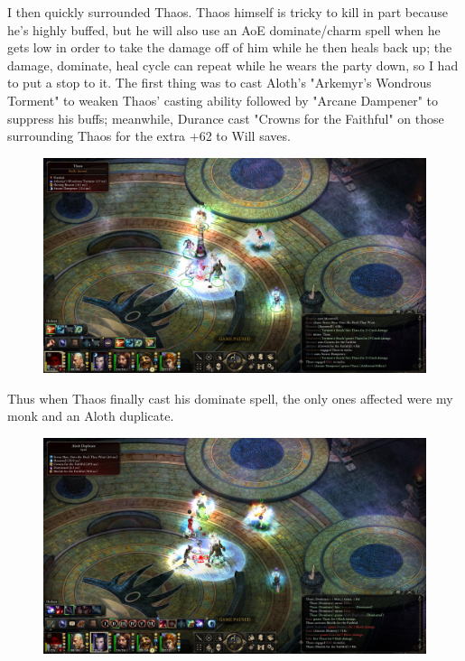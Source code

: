 \documentclass{article}
\begin{document}
I then quickly surrounded Thaos.  Thaos himself is tricky to kill in part because he's highly buffed, but he will also use an AoE dominate/charm spell when he gets low in order to take the damage off of him while he then heals back up; the damage, dominate, heal cycle can repeat while he wears the party down, so I had to put a stop to it.  The first thing was to cast Aloth's "Arkemyr's Wondrous Torment" to weaken Thaos' casting ability followed by "Arcane Dampener" to suppress his buffs; meanwhile, Durance cast "Crowns for the Faithful" on those surrounding Thaos for the extra +62 to Will saves.

\begin{figure}
\includegraphics[scale=0.33]{files/blog/2019_03_17_pillars_of_eternity_path_of_the_damned_act_iv/2019_03_17_thaos4.jpg}
\end{figure}

Thus when Thaos finally cast his dominate spell, the only ones affected were my monk and an Aloth duplicate.

\begin{figure}
\includegraphics[scale=0.33]{files/blog/2019_03_17_pillars_of_eternity_path_of_the_damned_act_iv/2019_03_17_thaos5.jpg}
\end{figure}
\end{document}
